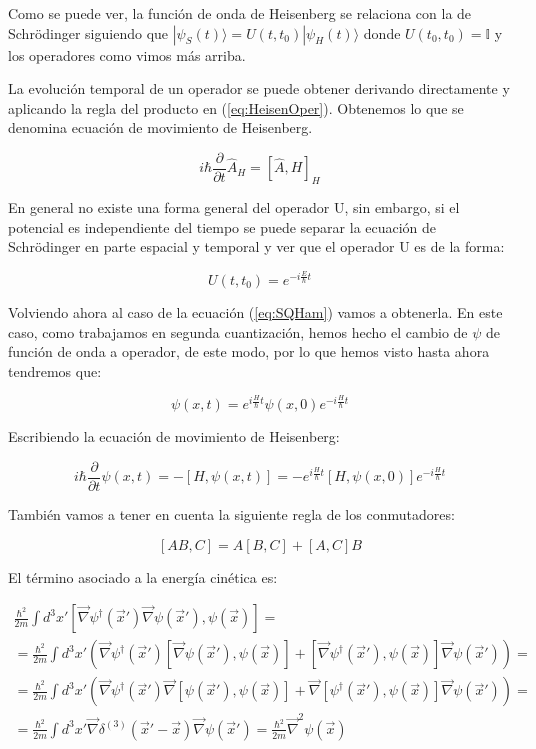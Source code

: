 \documentclass{article} %
\begin{document}
Como se puede ver, la función de onda de Heisenberg se relaciona con la de Schrödinger siguiendo que $|\psi_S(t)\rangle=U(t, t_0)|\psi_H(t)\rangle$ donde $U(t_0, t_0) = \mathbb{I}$ y los operadores como vimos más arriba.

La evolución temporal de un operador se puede obtener derivando directamente y aplicando la regla del producto en (\ref{eq:HeisenOper}). Obtenemos lo que se denomina ecuación de movimiento de Heisenberg.

\begin{equation}
i\hbar\frac{\partial}{\partial t}\hat{A}_H=[\hat{A}, H]_H
\end{equation}

En general no existe una forma general del operador U, sin embargo, si el potencial es independiente del tiempo se puede separar la ecuación de Schrödinger en parte espacial y temporal y ver que el operador U es de la forma:

$$
U(t, t_0) = e^{-i\frac{E}{\hbar}t}
$$

Volviendo ahora al caso de la ecuación (\ref{eq:SQHam}) vamos a obtenerla. En este caso, como trabajamos en segunda cuantización, hemos hecho el cambio de $\psi$ de función de onda a operador, de este modo, por lo que hemos visto hasta ahora tendremos que:

$$
\psi(x, t) = e^{i\frac{H}{\hbar}t} \psi(x, 0) e^{-i\frac{H}{\hbar}t}
$$

Escribiendo la ecuación de movimiento de Heisenberg:

$$
i\hbar\frac{\partial}{\partial t}\psi(x, t) = -[H, \psi(x, t)] = - e^{i\frac{H}{\hbar}t} [H, \psi(x, 0)] e^{-i\frac{H}{\hbar}t}
$$

También vamos a tener en cuenta la siguiente regla de los conmutadores:

$$
[AB, C] = A[B, C] + [A, C]B
$$

El término asociado a la energía cinética es:

\begin{align*}
\frac{\hbar^2}{2m}\int d^3x' [\vec{\nabla}\psi^{\dagger}(\vec{x}') \vec{\nabla}\psi(\vec{x}'), \psi(\vec{x})] = \\ = \frac{\hbar^2}{2m}\int d^3x' \left( \vec{\nabla}\psi^{\dagger}(\vec{x}') [\vec{\nabla}\psi(\vec{x}'), \psi(\vec{x})] + [\vec{\nabla}\psi^{\dagger}(\vec{x}'), \psi(\vec{x})]\vec{\nabla}\psi(\vec{x}') \right) = \\ = \frac{\hbar^2}{2m} \int d^3 x' \left( \vec{\nabla}\psi^{\dagger}(\vec{x}') \vec{\nabla} [\psi(\vec{x}'), \psi(\vec{x})] + \vec{\nabla} [\psi^{\dagger}(\vec{x}'), \psi(\vec{x})] \vec{\nabla}\psi(\vec{x}') \right) = \\ = \frac{\hbar^2}{2m} \int d^3 x' \vec{\nabla} \delta^{(3)} (\vec{x}' - \vec{x}) \vec{\nabla} \psi(\vec{x}') = \frac{\hbar^2}{2m} \vec{\nabla}^2 \psi(\vec{x})
\end{align*}
\end{document}
